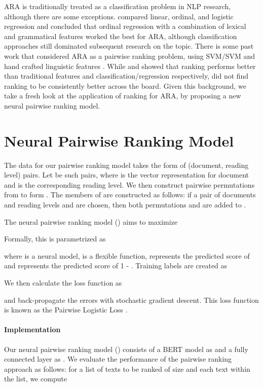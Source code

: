 \documentclass[11pt]{article}
\begin{document}
ARA is traditionally treated as a classification problem in NLP research, although there are some exceptions.  compared linear, ordinal, and logistic regression and concluded that ordinal regression with a combination of lexical and grammatical features worked the best for ARA, although classification approaches still dominated subsequent research on the topic. There is some past work that considered ARA as a pairwise ranking problem, using SVM/SVM and hand crafted linguistic features \cite{Pitler.Nenkova-08,Tanaka-Ishii.Tezuka.ea-10,Ma.Fosler-Lussier.ea-12,Mesgar.Strube-15,Ambati.Reddy.ea-16,Howcroft.Demberg-17}. While  and  showed that ranking performs better than traditional features and classification/regression respectively,  did not find ranking to be consistently better across the board. Given this background, we take a fresh look at the application of ranking for ARA, by proposing a new neural pairwise ranking model. 

\section{Neural Pairwise Ranking Model}
\label{sec:model}
The data for our pairwise ranking model takes the form of (document, reading level) pairs. Let  be  such pairs, where  is the vector representation for document  and  is the corresponding reading level. We then construct  pairwise permutations from  to form . The members of  are constructed as follows: if a pair of documents and reading levels  and  are chosen, then both permutations  and  are added to .  

The neural pairwise ranking model (\textit{}) aims to maximize


Formally, this is parametrized as 


where  is a neural model,  is a flexible function,  represents the predicted score of  and  represents the predicted score of 1 - .  
Training labels are created as 


We then calculate the loss function as 

and back-propagate the errors with stochastic gradient descent. This loss function is known as the Pairwise Logistic Loss \cite{Han.Wang.ea-20}.

\paragraph{Implementation} 
Our neural pairwise ranking model () consists of a BERT \cite{devlin2018bert} model as  and a fully connected layer as . We evaluate the performance of the pairwise ranking approach as follows: for a list of texts to be ranked of size  and each text  within the list,   we compute 
\end{document}
